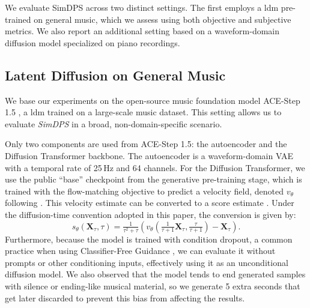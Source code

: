 \documentclass{article}
\begin{document}
We evaluate SimDPS across two distinct settings. 
The first employs a \ac{ldm} pre-trained on general music, which we assess using both objective and subjective metrics.
We also report an additional setting based on a waveform-domain diffusion model specialized on piano recordings.



\vspace{-5pt}
\subsection{Latent Diffusion on General Music}
\vspace{-3pt}

We base our experiments on the open-source music foundation model ACE-Step 1.5 \cite{gong2026ace}, a \ac{ldm} trained on a large-scale music dataset. This setting allows us to evaluate \textit{SimDPS} in a broad, non-domain-specific scenario.

Only two components are used from ACE-Step 1.5: the autoencoder and the Diffusion Transformer backbone.
The autoencoder is a waveform-domain VAE \cite{evans2025stable} with a temporal rate of 25\,Hz and 64 channels.
For the Diffusion Transformer, we use the public ``base'' checkpoint from the generative pre-training stage, which is trained with the flow-matching objective to predict a velocity field, denoted $v_\theta$ following \cite{lipman2022flow}. This velocity estimate can be converted to a score estimate \cite{schusterbauer2025diff2flow}. Under the diffusion-time convention adopted in this paper, the conversion is given by:
\begin{equation}
   s_\theta(\mathbf{X}_\tau, \tau) = \tfrac{1}{\tau^2 + \tau} \left(v_\theta\left(\tfrac{1}{\tau+1}\mathbf{X}_\tau, \tfrac{\tau}{\tau+1}\right)- \mathbf{X}_\tau \right).
\end{equation}
Furthermore, because the model is trained with condition dropout, a common practice when using Classifier-Free Guidance \cite{ho2022classifier}, we can evaluate it without prompts or other conditioning inputs, effectively using it as an unconditional diffusion model.
We also observed that the model tends to end generated samples with silence or ending-like musical material, so we generate 5 extra seconds that get later discarded to prevent this bias from affecting the results.
\end{document}
